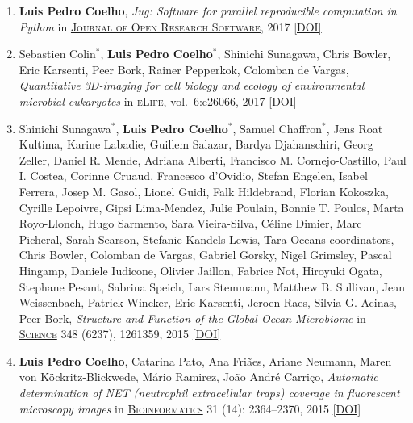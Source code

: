 \documentclass{article}
\newcommand\showdoi[1]{%
    \href{https://doi.org/#1}{[DOI]}%
}
\newcommand\pubname[1]{\textsc{\uline{#1}}}
\newcommand\contribution[1]{\relax}
\newcommand\costar{${}^{*}$}
\begin{document}
\begin{enumerate}[resume]
\item \textbf{Luis Pedro Coelho}, \emph{Jug: Software for parallel reproducible computation in Python} in \pubname{Journal of Open Research Software}, 2017 \showdoi{10.5334/jors.161}
\contribution{I designed and implemented the software presented and wrote the manuscript.}

\item Sebastien Colin\costar, \textbf{Luis Pedro Coelho}\costar, Shinichi Sunagawa, Chris Bowler, Eric Karsenti, Peer Bork, Rainer Pepperkok, Colomban de Vargas, \emph{Quantitative 3D-imaging for cell biology and ecology of environmental microbial eukaryotes} in \pubname{eLife}, vol.\ 6:e26066, 2017 \showdoi{10.7554/eLife.26066.001}
\contribution{I designed and implemented the computational analysis necessary
for the method presented in the paper and participated in the writing of the
manuscript.}

\item Shinichi Sunagawa\costar, \textbf{Luis Pedro Coelho}\costar, Samuel Chaffron\costar, Jens Roat Kultima, Karine Labadie, Guillem Salazar, Bardya Djahanschiri, Georg Zeller, Daniel R. Mende, Adriana Alberti, Francisco M. Cornejo-Castillo, Paul I. Costea, Corinne Cruaud, Francesco d'Ovidio, Stefan Engelen, Isabel Ferrera, Josep M. Gasol, Lionel Guidi, Falk Hildebrand, Florian Kokoszka, Cyrille Lepoivre, Gipsi Lima-Mendez, Julie Poulain, Bonnie T. Poulos, Marta Royo-Llonch, Hugo Sarmento, Sara Vieira-Silva, Céline Dimier, Marc Picheral, Sarah Searson, Stefanie Kandels-Lewis, Tara Oceans coordinators, Chris Bowler, Colomban de Vargas, Gabriel Gorsky, Nigel Grimsley, Pascal Hingamp, Daniele Iudicone, Olivier Jaillon, Fabrice Not, Hiroyuki Ogata, Stephane Pesant, Sabrina Speich, Lars Stemmann, Matthew B. Sullivan, Jean Weissenbach, Patrick Wincker, Eric Karsenti, Jeroen Raes, Silvia G. Acinas, Peer Bork, \emph{Structure and Function of the Global Ocean Microbiome} in \pubname{Science} 348 (6237), 1261359, 2015 \showdoi{10.1126/science.1261359}
\contribution{As co-first author, I performed analysis of the data, including
linking the metagenomics data to the environmental parameters, as well as the
comparison to the human gut (this required extending existing software tools
which were unable to scale to this dataset); and helped draft the manuscript.}

\item \textbf{Luis Pedro Coelho}, Catarina Pato, Ana Friães, Ariane Neumann, Maren von Köckritz-Blickwede, Mário Ramirez, João André Carriço, \emph{Automatic determination of NET (neutrophil extracellular traps) coverage in fluorescent microscopy images} in \pubname{Bioinformatics} 31 (14): 2364--2370, 2015 \showdoi{10.1093/bioinformatics/btv156}
\contribution{I conceived and implemented the algorithm, and wrote the
manuscript.}


\end{enumerate}
\end{document}

